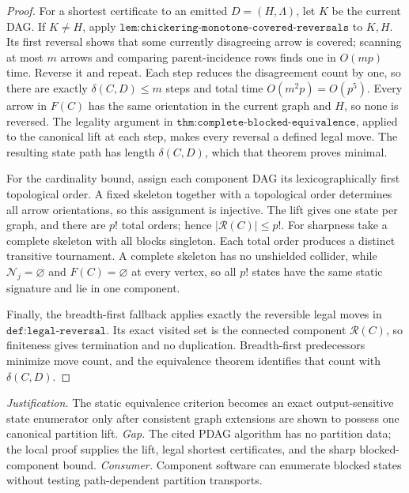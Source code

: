 \documentclass{article}
\begin{document}
\begin{proof}
For a shortest certificate to an emitted \(D=(H,\Lambda)\), let \(K\) be the current DAG. If \(K\neq H\), apply \(\texttt{lem:chickering-monotone-covered-reversals}\) to \(K,H\). Its first reversal shows that some currently disagreeing arrow is covered; scanning at most \(m\) arrows and comparing parent-incidence rows finds one in \(O(mp)\) time. Reverse it and repeat. Each step reduces the disagreement count by one, so there are exactly \(\delta(C,D)\leq m\) steps and total time \(O(m^2p)=O(p^5)\). Every arrow in \(F(C)\) has the same orientation in the current graph and \(H\), so none is reversed. The legality argument in \(\texttt{thm:complete-blocked-equivalence}\), applied to the canonical lift at each step, makes every reversal a defined legal move. The resulting state path has length \(\delta(C,D)\), which that theorem proves minimal.

For the cardinality bound, assign each component DAG its lexicographically first topological order. A fixed skeleton together with a topological order determines all arrow orientations, so this assignment is injective. The lift gives one state per graph, and there are \(p!\) total orders; hence \(|\mathcal R(C)|\leq p!\). For sharpness take a complete skeleton with all blocks singleton. Each total order produces a distinct transitive tournament. A complete skeleton has no unshielded collider, while \(\mathcal N_j=\varnothing\) and \(F(C)=\varnothing\) at every vertex, so all \(p!\) states have the same static signature and lie in one component.

Finally, the breadth-first fallback applies exactly the reversible legal moves in \(\texttt{def:legal-reversal}\). Its exact visited set is the connected component \(\mathcal R(C)\), so finiteness gives termination and no duplication. Breadth-first predecessors minimize move count, and the equivalence theorem identifies that count with \(\delta(C,D)\).
\end{proof}
\par\smallskip\noindent \textit{Justification.} The static equivalence criterion becomes an exact output-sensitive state enumerator only after consistent graph extensions are shown to possess one canonical partition lift. \textit{Gap.} The cited PDAG algorithm has no partition data; the local proof supplies the lift, legal shortest certificates, and the sharp blocked-component bound. \textit{Consumer.} Component software can enumerate blocked states without testing path-dependent partition transports.
\end{document}
